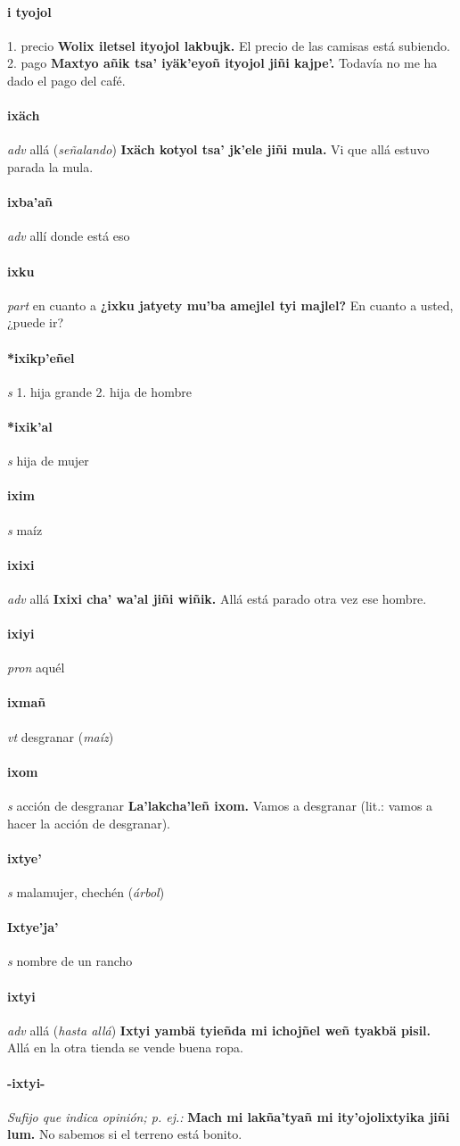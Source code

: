 \documentclass{scrbook}
\newcommand{\entry}[1]{\paragraph{#1}}
\newcommand{\onedefinition}[1]{#1.}
\newcommand{\nontranslationdef}[1]{\textit{#1}}
\newcommand{\partofspeech}[1]{\textit{#1}}
\newcommand{\spanishtranslation}[1]{#1}
\newcommand{\clarification}[1]{(\textit{#1})}
\newcommand{\cholexample}[1]{\textbf{#1}}
\newcommand{\exampletranslation}[1]{#1}
\begin{document}
\begin{multicols}{2}
\entry{i tyojol}
\onedefinition{1}
\spanishtranslation{precio}
\cholexample{Wolix iletsel ityojol lakbujk.}
\exampletranslation{El precio de las camisas está subiendo.}
\onedefinition{2}
\spanishtranslation{pago}
\cholexample{Maxtyo añik tsa' iyäk'eyoñ ityojol jiñi kajpe'.}
\exampletranslation{Todavía no me ha dado el pago del café.}

\entry{ixäch}
\partofspeech{adv}
\spanishtranslation{allá}
\clarification{señalando}
\cholexample{Ixäch kotyol tsa' jk'ele jiñi mula.}
\exampletranslation{Vi que allá estuvo parada la mula.}

\entry{ixba'añ}
\partofspeech{adv}
\spanishtranslation{allí donde está eso}

\entry{ixku}
\partofspeech{part}
\spanishtranslation{en cuanto a}
\cholexample{¿ixku jatyety mu'ba amejlel tyi majlel?}
\exampletranslation{En cuanto a usted, ¿puede ir?}

\entry{*ixikp'eñel}
\partofspeech{s}
\onedefinition{1}
\spanishtranslation{hija grande}
\onedefinition{2}
\spanishtranslation{hija de hombre}

\entry{*ixik'al}
\partofspeech{s}
\spanishtranslation{hija de mujer}

\entry{ixim}
\partofspeech{s}
\spanishtranslation{maíz}

\entry{ixixi}
\partofspeech{adv}
\spanishtranslation{allá}
\cholexample{Ixixi cha' wa'al jiñi wiñik.}
\exampletranslation{Allá está parado otra vez ese hombre.}

\entry{ixiyi}
\partofspeech{pron}
\spanishtranslation{aquél}

\entry{ixmañ}
\partofspeech{vt}
\spanishtranslation{desgranar}
\clarification{maíz}

\entry{ixom}
\partofspeech{s}
\spanishtranslation{acción de desgranar}
\cholexample{La'lakcha'leñ ixom.}
\exampletranslation{Vamos a desgranar (lit.: vamos a hacer la acción de desgranar).}

\entry{ixtye'}
\partofspeech{s}
\spanishtranslation{malamujer, chechén}
\clarification{árbol}

\entry{Ixtye'ja'}
\partofspeech{s}
\spanishtranslation{nombre de un rancho}

\entry{ixtyi}
\partofspeech{adv}
\spanishtranslation{allá}
\clarification{hasta allá}
\cholexample{Ixtyi yambä tyieñda mi ichojñel weñ tyakbä pisil.}
\exampletranslation{Allá en la otra tienda se vende buena ropa.}

\entry{-ixtyi-}
\nontranslationdef{Sufijo que indica opinión; p. ej.:}
\cholexample{Mach mi lakña'tyañ mi ity'ojolixtyika jiñi lum.}
\exampletranslation{No sabemos si el terreno está bonito.}


\end{multicols}
\end{document}
